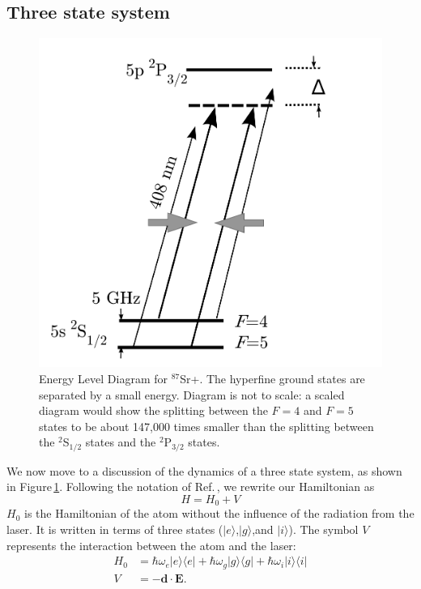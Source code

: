 \subsection{Three state system}
\begin{figure}
\centerline{
\includegraphics[totalheight=0.3\textheight]{E_level_from_proposal}
}
\caption[Energy Level Diagram for $^{87}$Sr+]{Energy Level Diagram for $^{87}$Sr+. The hyperfine ground states are separated by a small energy. Diagram is not to scale: a scaled diagram would show the splitting between the $F=4$ and $F=5$ states to be about 147,000 times smaller than the splitting between the $^2$S$_{1/2}$ states and the $^2$P$_{3/2}$ states.}
\label{energyLevelDiagramFigure}
\end{figure}
We now move to a discussion of the dynamics of a three state system, as shown in Figure\,\ref{energyLevelDiagramFigure}. Following the notation of Ref.\,\cite{Young1997363}, we rewrite our Hamiltonian as
\begin{equation}
H=H_0+V
\end{equation}
$H_0$ is the Hamiltonian of the atom without the influence of the radiation from the laser. It is written in terms of three states ($|e\rangle$,$|g\rangle$,and $|i\rangle$). The symbol $V$ represents the interaction between the atom and the laser: 
\begin{align}
H_0&=
\hbar\omega_e |e\rangle\langle e | +
\hbar\omega_g |g\rangle\langle g | +
\hbar\omega_i |i\rangle\langle i | \\ 
V&=-\mathbf{d}\cdot\mathbf{E}.
\end{align}
